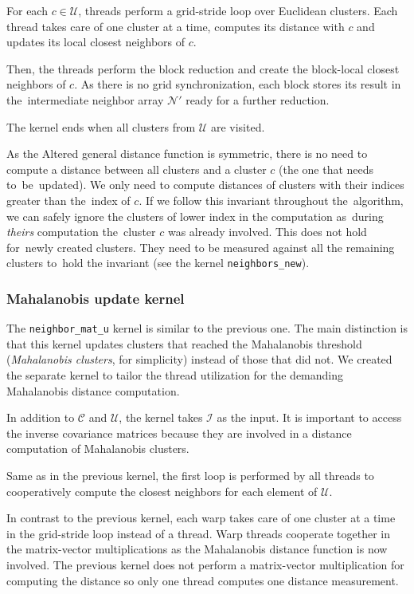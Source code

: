 For each $c \in \mathcal{U}$, threads perform a grid-stride loop over Euclidean clusters. Each thread takes care of one cluster at a time, computes its distance with $c$ and updates its local closest neighbors of $c$.

Then, the threads perform the block reduction and create the block-local closest neighbors of $c$. As there is no grid synchronization, each block stores its result in the~intermediate neighbor array $\mathcal{N}'$ ready for a further reduction.

The kernel ends when all clusters from $\mathcal{U}$ are visited.

\begin{rem}
	As the Altered general distance function is symmetric, there is no need to compute a distance between all clusters and a cluster $c$ (the one that needs to~be~updated). We only need to compute distances of clusters with their indices greater than the~index of $c$. If we follow this invariant throughout the~algorithm, we can safely ignore the clusters of lower index in the computation as~during \emph{theirs} computation the~cluster $c$ was already involved. This does not hold for~newly created clusters. They need to be measured against all the remaining clusters to~hold the invariant (see the kernel \texttt{neighbors\_new}).
\end{rem}

\subsubsection{Mahalanobis update kernel} The \texttt{neighbor\_mat\_u} kernel is similar to the previous one. The main distinction is that this kernel updates clusters that reached the Mahalanobis threshold (\emph{Mahalanobis clusters}, for simplicity) instead of those that did not. We created the separate kernel to tailor the thread utilization for the demanding Mahalanobis distance computation.

In addition to $\mathcal{C}$ and $\mathcal{U}$, the kernel takes $\mathcal{I}$ as the input. It is important to access the inverse covariance matrices because they are involved in a distance computation of Mahalanobis clusters. 

Same as in the previous kernel, the first loop is performed by all threads to cooperatively compute the closest neighbors for each element of $\mathcal{U}$.

In contrast to the previous kernel, each warp takes care of one cluster at a time in the grid-stride loop instead of a thread. Warp threads cooperate together in the matrix-vector multiplications as the Mahalanobis distance function is now involved. The previous kernel does not perform a matrix-vector multiplication for computing the distance so only one thread computes one distance measurement.

